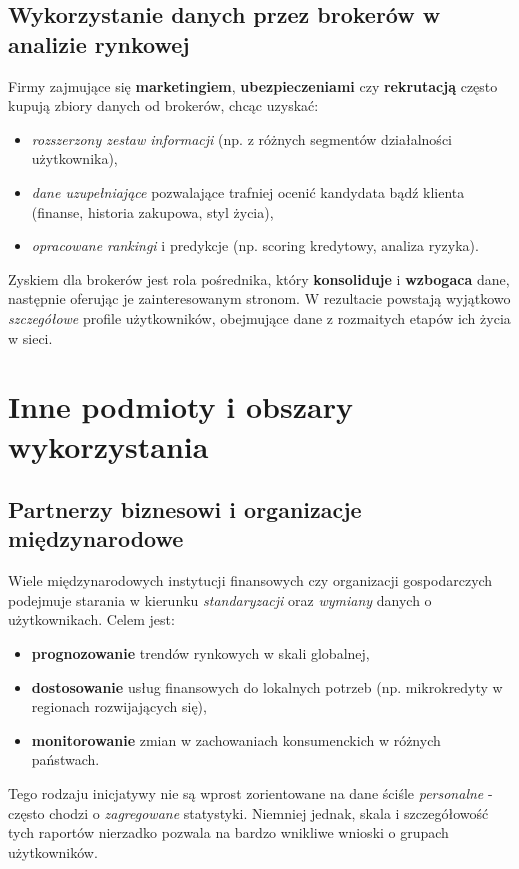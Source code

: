 \subsection{Wykorzystanie danych przez brokerów w analizie rynkowej}
Firmy zajmujące się \textbf{marketingiem}, \textbf{ubezpieczeniami} czy \textbf{rekrutacją} często kupują zbiory danych od brokerów, chcąc uzyskać:
\begin{itemize}
    \item \emph{rozszerzony zestaw informacji} (np. z różnych segmentów działalności użytkownika),
    \item \emph{dane uzupełniające} pozwalające trafniej ocenić kandydata bądź klienta (finanse, historia zakupowa, styl życia),
    \item \emph{opracowane rankingi} i predykcje (np. scoring kredytowy, analiza ryzyka).
\end{itemize}
Zyskiem dla brokerów jest rola pośrednika, który \textbf{konsoliduje} i \textbf{wzbogaca} dane, następnie oferując je zainteresowanym stronom. W rezultacie powstają wyjątkowo \emph{szczegółowe} profile użytkowników, obejmujące dane z rozmaitych etapów ich życia w sieci.

\vspace{1em}

\section{Inne podmioty i obszary wykorzystania}

\subsection{Partnerzy biznesowi i organizacje międzynarodowe}
Wiele międzynarodowych instytucji finansowych czy organizacji gospodarczych podejmuje starania w kierunku \emph{standaryzacji} oraz \emph{wymiany} danych o użytkownikach. Celem jest:
\begin{itemize}
    \item \textbf{prognozowanie} trendów rynkowych w skali globalnej,
    \item \textbf{dostosowanie} usług finansowych do lokalnych potrzeb (np. mikrokredyty w regionach rozwijających się),
    \item \textbf{monitorowanie} zmian w zachowaniach konsumenckich w różnych państwach.
\end{itemize}
Tego rodzaju inicjatywy nie są wprost zorientowane na dane ściśle \emph{personalne} - często chodzi o \emph{zagregowane} statystyki. Niemniej jednak, skala i szczegółowość tych raportów nierzadko pozwala na bardzo wnikliwe wnioski o grupach użytkowników.

